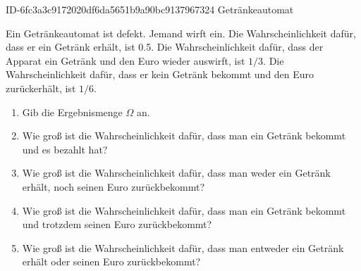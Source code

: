 \begin{exercise}
      {ID-6fc3a3c9172020df6da5651b9a90bc9137967324}
      {Getränkeautomat}
  \ifproblem\problem\par
    Ein Getränkeautomat ist defekt. Jemand wirft  ein. Die Wahrscheinlichkeit
    dafür, dass er ein Getränk erhält, ist \num{0.5}. Die Wahrscheinlichkeit dafür,
    dass der Apparat ein Getränk und den Euro wieder auswirft, ist $1/3$.
    Die Wahrscheinlichkeit dafür, dass er kein Getränk bekommt und den Euro
    zurückerhält, ist $1/6$.
    \begin{enumerate}
      \item Gib die Ergebnismenge $\Omega$ an.
      \item Wie groß ist die Wahrscheinlichkeit dafür, dass man ein Getränk
            bekommt und es bezahlt hat?
      \item Wie groß ist die Wahrscheinlichkeit dafür, dass man weder ein
            Getränk erhält, noch seinen Euro zurückbekommt?
      \item Wie groß ist die Wahrscheinlichkeit dafür, dass man ein Getränk
            bekommt und trotzdem seinen Euro zurückbekommt?
      \item Wie groß ist die Wahrscheinlichkeit dafür, dass man entweder
            ein Getränk erhält oder seinen Euro zurückbekommt?
    \end{enumerate}
  \fi
\end{exercise}
